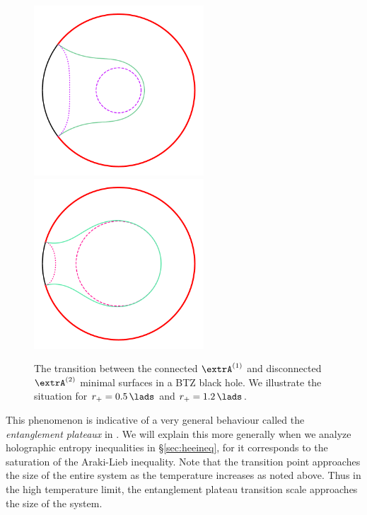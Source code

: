 \documentclass[12pt,openany]{book}
\begin{document}
\begin{figure}[tp]
\begin{center}
\includegraphics[width=2.5in]{figures/ALtransition-rh0p5}
\hspace{2cm}
\includegraphics[width=2.5in]{figures/ALtransition-rh1p2}
\end{center}
\caption{ The transition between the connected $\extrA^{(1)}$ and disconnected  $\extrA^{(2)}$ minimal surfaces  in a BTZ black hole.
We illustrate the situation for $r_+ =0.5\, \lads$ and $r_+ = 1.2 \,\lads$. }
\label{f:ALtransition}
\end{figure}
%

This phenomenon is indicative of a very general behaviour called the \emph{entanglement plateaux} in \cite{Hubeny:2013gta}. We will explain this more generally when we analyze holographic entropy inequalities in \S\ref{sec:heeineq}, for it corresponds to the saturation of the Araki-Lieb inequality. Note that the transition point approaches the size of the entire system as the temperature increases as noted above. Thus in the high temperature limit, the entanglement plateau transition scale approaches the size of the  system.
\end{document}

